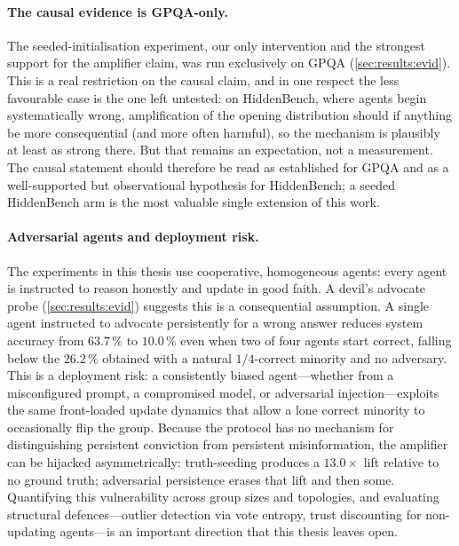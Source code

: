 \paragraph{The causal evidence is GPQA-only.}
The seeded-initialisation experiment, our only intervention and the strongest
support for the amplifier claim, was run exclusively on GPQA
(\autoref{sec:results:evid}). This is a real restriction on the causal claim,
and in one respect the less favourable case is the one left untested: on
HiddenBench, where agents begin systematically wrong, amplification of the opening
distribution should if anything be more consequential (and more often harmful),
so the mechanism is plausibly at least as strong there. But that remains an
expectation, not a measurement. The causal statement should therefore be read as
established for GPQA and as a well-supported but observational hypothesis for
HiddenBench; a seeded HiddenBench arm is the most valuable single extension of this
work.

\paragraph{Adversarial agents and deployment risk.}
The experiments in this thesis use cooperative, homogeneous agents: every agent is
instructed to reason honestly and update in good faith.
A devil's advocate probe (\autoref{sec:results:evid}) suggests this is a
consequential assumption.
A single agent instructed to advocate persistently for a wrong answer reduces
system accuracy from $63.7\,\%$ to $10.0\,\%$ even when two of four agents start
correct, falling below the $26.2\,\%$ obtained with a natural $1/4$-correct
minority and no adversary.
This is a deployment risk: a consistently biased agent---whether from a
misconfigured prompt, a compromised model, or adversarial injection---exploits the
same front-loaded update dynamics that allow a lone correct minority to occasionally
flip the group.
Because the protocol has no mechanism for distinguishing persistent conviction from
persistent misinformation, the amplifier can be hijacked asymmetrically: truth-seeding
produces a $13.0\times$ lift relative to no ground truth; adversarial persistence
erases that lift and then some.
Quantifying this vulnerability across group sizes and topologies, and evaluating
structural defences---outlier detection via vote entropy, trust discounting for
non-updating agents---is an important direction that this thesis leaves open.

